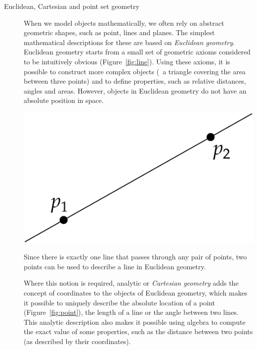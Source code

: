 \begin{description}
\item[Euclidean, Cartesian and point set geometry]
When we model objects mathematically, we often rely on abstract geometric shapes, such as point, lines and planes.
The simplest mathematical descriptions for these are based on \emph{Euclidean geometry}.
Euclidean geometry starts from a small set of geometric axioms considered to be intuitively obvious (Figure~\ref{fig:line}).
Using these axioms, it is possible to construct more complex objects (\eg\ a triangle covering the area between three points) and to define properties, such as relative distances, angles and areas.
However, objects in Euclidean geometry do not have an absolute position in space.

\begin{marginfigure}
\centering
\includegraphics[width=\linewidth]{figs/line.pdf}
\caption{Since there is exactly one line that passes through any pair of points, two points can be used to describe a line in Euclidean geometry.}%
\label{fig:line}
\end{marginfigure}

Where this notion is required, analytic or \emph{Cartesian geometry} adds the concept of coordinates to the objects of Euclidean geometry, which makes it possible to uniquely describe the absolute location of a point (Figure~\ref{fig:point}), the length of a line or the angle between two lines.
This analytic description also makes it possible using algebra to compute the exact value of some properties, such as the distance between two points (as described by their coordinates).


\end{description}
